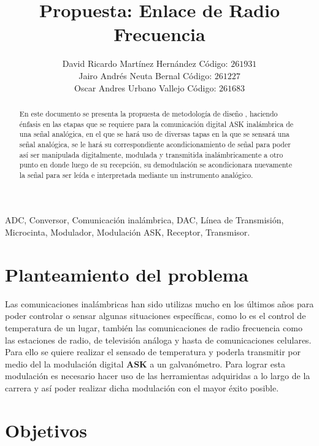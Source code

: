 \documentclass[twocolumn]{IEEEtran}
\begin{document}
\title{Propuesta: Enlace de Radio Frecuencia}
\author{David Ricardo Martínez Hernández Código: $261931$\\
	Jairo Andrés Neuta Bernal Código: $261227$\\
	Oscar Andres Urbano Vallejo Código: $261683$}
\maketitle
{}
\begin{keywords}
 ADC, Conversor, Comunicación inalámbrica, DAC, Línea de Transmisión, Microcinta, Modulador, Modulación ASK, Receptor, Transmisor.
\end{keywords}
\begin{abstract}
 En este documento se presenta la propuesta de metodología de diseño ,  haciendo énfasis en las etapas que se requiere para la comunicación digital ASK inalámbrica de una señal analógica, en el que se hará uso de diversas tapas en la que se sensará una señal analógica, se le hará su correspondiente acondicionamiento de señal para poder así ser manipulada digitalmente,  modulada y transmitida inalámbricamente a otro punto en donde luego de su recepción, su demodulación se acondicionara nuevamente la señal para ser leída e interpretada mediante un instrumento analógico. 
\end{abstract}

\section{Planteamiento del problema}
\noindent
Las comunicaciones inalámbricas han sido utilizas mucho en los últimos años para poder controlar o sensar algunas situaciones específicas, como lo es el control de temperatura de un lugar, también las comunicaciones de radio frecuencia como las estaciones de radio, de televisión análoga y hasta de comunicaciones celulares.\\
Para ello se quiere realizar el sensado de temperatura y poderla transmitir por medio del la modulación digital \textbf{ASK} a un galvanómetro. Para lograr esta modulación es necesario hacer uso de las herramientas adquiridas a lo largo de la carrera y así poder realizar dicha modulación con el mayor éxito posible.

\section{Objetivos}
\end{document}
